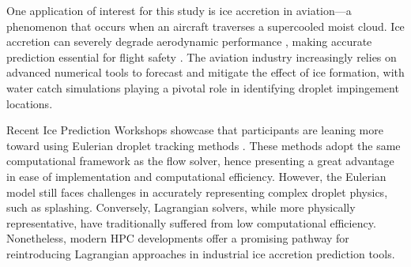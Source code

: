 One application of interest for this study is ice accretion in aviation—a phenomenon that occurs when an aircraft traverses a supercooled moist cloud. Ice accretion can severely degrade aerodynamic performance \cite{lynch2001effects, cao2015aircraft}, making accurate prediction essential for flight safety \cite{CAO2018353}. The aviation industry increasingly relies on advanced numerical tools to forecast and mitigate the effect of ice formation, with water catch simulations playing a pivotal role in identifying droplet impingement locations. 

Recent Ice Prediction Workshops \cite{laurendeau2022summary, laurendeau2024summary} showcase that participants are leaning more toward using Eulerian droplet tracking methods \cite{ICEPAC, JAXA, FENSAP, ONERA, CIRA}. These methods adopt the same computational framework as the flow solver, hence presenting a great advantage in ease of implementation and computational efficiency. However, the Eulerian model still faces challenges in accurately representing complex droplet physics, such as splashing. Conversely, Lagrangian solvers, while more physically representative, have traditionally suffered from low computational efficiency. Nonetheless, modern HPC developments offer a promising pathway for reintroducing Lagrangian approaches in industrial ice accretion prediction tools.


